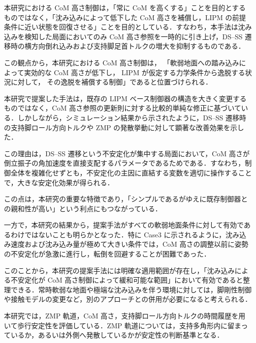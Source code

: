 本研究における CoM 高さ制御は，「常に CoM を高くする」ことを目的とするものではなく，「沈み込みによって低下した CoM 高さを補償し，LIPM の前提条件に近い状態を回復させる」ことを目的としている．すなわち，本手法は沈み込みを検知した局面においてのみ CoM 高さ参照を一時的に引き上げ，DS--SS 遷移時の横方向倒れ込みおよび支持脚足首トルクの増大を抑制するものである．

この観点から，本研究における CoM 高さ制御は，
「軟弱地面への踏み込みによって実効的な CoM 高さが低下し，
LIPM が仮定する力学条件から逸脱する状況に対して，
その逸脱を補償する制御」であると位置づけられる．

\label{sec:qa_simple_but_effective}

本研究で提案した手法は，既存の LIPM ベース制御器の構造を大きく変更するものではなく，CoM 高さ参照の更新則に対する比較的単純な修正に基づいている．しかしながら，シミュレーション結果から示されたように，DS--SS 遷移時の支持脚ロール方向トルクや ZMP の発散挙動に対して顕著な改善効果を示した．

この理由は，DS--SS 遷移という不安定化が集中する局面において，CoM 高さが倒立振子の角加速度を直接支配するパラメータであるためである．すなわち，制御全体を複雑化せずとも，不安定化の主因に直結する変数を適切に操作することで，大きな安定化効果が得られる．

この点は，本研究の重要な特徴であり，「シンプルであるがゆえに既存制御器との親和性が高い」という利点にもつながっている．

\label{sec:qa_applicability_limit}

一方で，本研究の結果から，提案手法がすべての軟弱地面条件に対して有効であるわけではないことも明らかとなった．特に Case3 に示されるように，沈み込み速度および沈み込み量が極めて大きい条件では，CoM 高さの調整以前に姿勢の不安定化が急激に進行し，転倒を回避することが困難であった．

このことから，本研究の提案手法には明確な適用範囲が存在し，「沈み込みによる不安定化が CoM 高さ制御によって緩和可能な範囲」において有効であると整理できる．常時軟弱な地面や極端な沈み込みを伴う環境に対しては，脚剛性制御や接触モデルの変更など，別のアプローチとの併用が必要になると考えられる．

\label{sec:qa_graph_explanation}

本研究では，ZMP 軌道，CoM 高さ，支持脚ロール方向トルクの時間履歴を用いて歩行安定性を評価している．ZMP 軌道については，支持多角形内に留まっているか，あるいは外側へ発散しているかが安定性の判断基準となる．

